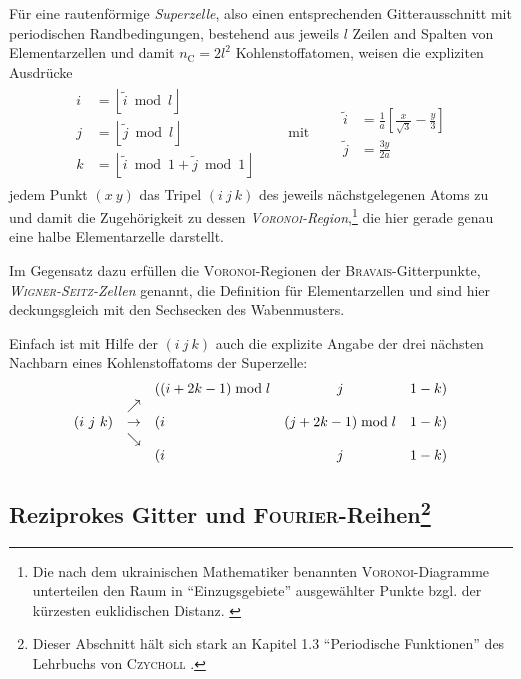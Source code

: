 \documentclass[a4paper, 10pt, twoside, openany]{book} %
\newcommand \bracks[1]{\left [ #1 \right ]}
\newcommand \floor[1]{\left \lfloor #1 \right \rfloor}
\def \mod {\bmod}
\def \nC {n_\mathrm{C}}
\begin{document}
	Für eine rautenförmige \emph{Superzelle}, also einen entsprechenden Gitterausschnitt mit periodischen Randbedingungen, bestehend aus jeweils $l$ Zeilen and Spalten von Elementarzellen und damit $\nC = 2 l^2$ Kohlenstoffatomen, weisen die expliziten Ausdrücke
	\begin{align}
		\begin{aligned}
			i &= \floor{\tilde i \mod l} \\
			j &= \floor{\tilde j \mod l} \\
			k &= \floor{\tilde i \mod 1 + \tilde j \mod 1}
		\end{aligned}
		\qquad \text{mit} \qquad
		\begin{aligned}
			\tilde i &= \frac 1 a \bracks{\frac x {\sqrt 3} - \frac y 3} \\
			\tilde j &= \frac{3 y}{2 a}
		\end{aligned}
		\label{ijk}
	\end{align}
	jedem Punkt $(x \ y)$ das Tripel $(i \ j \ k)$ des jeweils nächstgelegenen Atoms zu und damit die Zugehörigkeit zu dessen \emph{\textsc{Voronoi}-Region},\footnote{Die nach dem ukrainischen Mathematiker benannten \textsc{Voronoi}-Diagramme unterteilen den Raum in "`Einzugsgebiete"' ausgewählter Punkte bzgl. der kürzesten euklidischen Distanz. \cite[S.~10]{Edelsbrunner}} die hier gerade genau eine halbe Elementarzelle darstellt.
	
	Im Gegensatz dazu erfüllen die \textsc{Voronoi}-Regionen der \textsc{Bravais}-Gitterpunkte, \emph{\textsc{Wigner-Seitz}-Zellen} genannt, die Definition für Elementarzellen und sind hier deckungsgleich mit den Sechsecken des Wabenmusters.
	
	Einfach ist mit Hilfe der $(i \ j \ k)$ auch die explizite Angabe der drei nächsten Nachbarn eines Kohlenstoffatoms der Superzelle:
	\begin{align*}
	    \begin{array}{r c l c r}
			& & ((i + 2 k - 1) \mod l & j & 1 - k) \\
			& \nearrow & & & \\
			(i \ j \ k) & \rightarrow & (i & (j + 2 k - 1) \mod l & 1 - k) \\
			& \searrow & & & \\
			& & (i & j & 1 - k)
		\end{array}
	\end{align*}
	
	\subsection[Reziprokes Gitter und \textsc{Fourier}-Reihen]{Reziprokes Gitter und \textsc{Fourier}-Reihen\footnote{Dieser Abschnitt hält sich stark an Kapitel 1.3 "`Periodische Funktionen"' des Lehrbuchs von \textsc{Czycholl} \cite[S.~18f]{Czycholl}.}}
	
\end{document}
